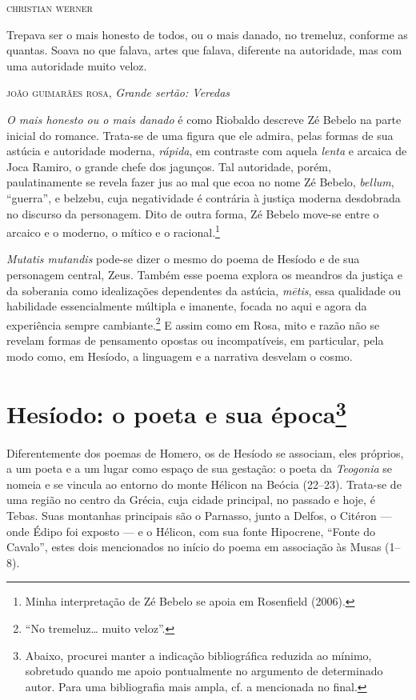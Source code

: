 \begin{flushright}
\textsc{christian werner}
\end{flushright}

Trepava ser o mais honesto de todos, ou o mais
danado, no tremeluz, conforme as quantas. Soava
no que falava, artes que falava, diferente
na autoridade, mas com uma autoridade muito veloz.

\textsc{joão guimarães rosa}, \textit{Grande sertão: Veredas}

\noindent{}\textit{O mais honesto ou o mais danado} é como Riobaldo descreve Zé
Bebelo na parte inicial do romance. Trata-se de uma figura que ele
admira, pelas formas de sua astúcia e autoridade moderna, \textit{rápida}, em
contraste com aquela \textit{lenta} e arcaica de Joca Ramiro, o grande chefe
dos jagunços. Tal autoridade, porém, paulatinamente se revela fazer jus
ao mal que ecoa no nome Zé Bebelo, \textit{bellum}, ``guerra'', e belzebu,
cuja negatividade é contrária à justiça moderna desdobrada no discurso
da personagem. Dito de outra forma, Zé Bebelo move-se entre o arcaico e
o moderno, o mítico e o racional.\footnote{Minha interpretação de Zé
  Bebelo se apoia em Rosenfield (2006).}

\textit{Mutatis mutandis} pode-se dizer o mesmo do poema de Hesíodo e de
sua personagem central, Zeus. Também esse poema explora os meandros da
justiça e da soberania como idealizações dependentes da astúcia, \textit{mētis}, essa qualidade ou habilidade essencialmente múltipla e
imanente, focada no aqui e agora da experiência sempre cambiante.\footnote{``No
tremeluz\ldots{} muito veloz''.} E assim como em Rosa, mito e razão não
se revelam formas de pensamento opostas ou incompatíveis, em particular,
pela modo como, em Hesíodo, a linguagem e a narrativa desvelam o cosmo.

\section{Hesíodo: o poeta e sua época\protect\footnote{\MakeUppercase{A}baixo, procurei manter a
  indicação bibliográfica reduzida ao mínimo, sobretudo quando me apoio
  pontualmente no argumento de determinado autor. \MakeUppercase{P}ara uma bibliografia
  mais ampla, cf. a mencionada no final.}}

Diferentemente dos poemas de Homero, os de Hesíodo se associam, eles
próprios, a um poeta e a um lugar como espaço de sua gestação: o poeta
da \textit{Teogonia} se nomeia e se vincula ao entorno do monte Hélicon na
Beócia (22--23). Trata-se de uma região no centro da Grécia, cuja cidade
principal, no passado e hoje, é Tebas. Suas montanhas principais são o
Parnasso, junto a Delfos, o Citéron --- onde Édipo foi exposto --- e o
Hélicon, com sua fonte Hipocrene, ``Fonte do Cavalo'', estes dois
mencionados no início do poema em associação às Musas (1--8).


